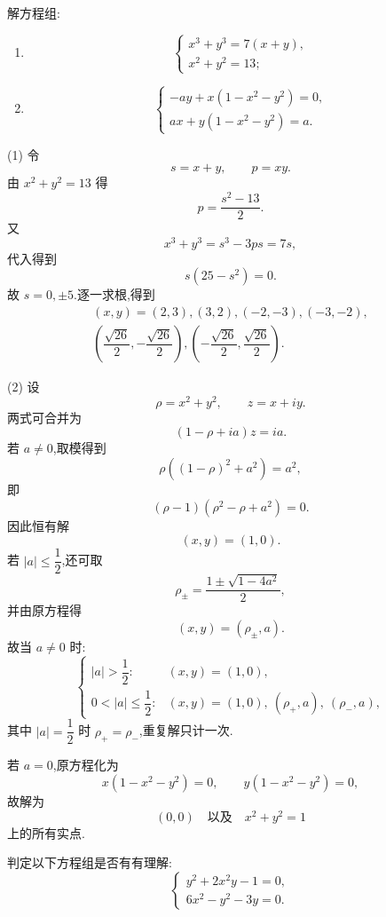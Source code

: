 \begin{example}
解方程组:
\begin{enumerate}
  \item
  \[
  \begin{cases}
    x^3+y^3=7(x+y),\\
    x^2+y^2=13;
  \end{cases}
  \]
  \item
  \[
  \begin{cases}
    -ay+x(1-x^2-y^2)=0,\\
    ax+y(1-x^2-y^2)=a.
  \end{cases}
  \]
\end{enumerate}
\end{example}
\exampleblank

\begin{solution}

(1) 令
\[
  s=x+y,
  \qquad
  p=xy.
\]
由 $x^2+y^2=13$ 得
\[
  p=\dfrac{s^2-13}{2}.
\]
又
\[
  x^3+y^3=s^3-3ps=7s,
\]
代入得到
\[
  s(25-s^2)=0.
\]
故 $s=0,\pm5$.逐一求根,得到
\[
\boxed{
\begin{gathered}
  (x,y)=(2,3),(3,2),(-2,-3),(-3,-2),\\
  \left(\dfrac{\sqrt{26}}2,-\dfrac{\sqrt{26}}2\right),
  \left(-\dfrac{\sqrt{26}}2,\dfrac{\sqrt{26}}2\right).
\end{gathered}}
\]

(2) 设
\[
  \rho=x^2+y^2,
  \qquad
  z=x+iy.
\]
两式可合并为
\[
  (1-\rho+ia)z=ia.
\]
若 $a\ne0$,取模得到
\[
  \rho\left((1-\rho)^2+a^2\right)=a^2,
\]
即
\[
  (\rho-1)(\rho^2-\rho+a^2)=0.
\]
因此恒有解
\[
  (x,y)=(1,0).
\]
若 $|a|\le\dfrac12$,还可取
\[
  \rho_{\pm}=\dfrac{1\pm\sqrt{1-4a^2}}2,
\]
并由原方程得
\[
  (x,y)=(\rho_{\pm},a).
\]
故当 $a\ne0$ 时:
\[
\boxed{
\begin{cases}
|a|>\dfrac12:&(x,y)=(1,0),\\[0.6ex]
0<|a|\le\dfrac12:&(x,y)=(1,0),\ (\rho_+,a),\ (\rho_-,a),
\end{cases}}
\]
其中 $|a|=\dfrac12$ 时 $\rho_+=\rho_-$,重复解只计一次.

若 $a=0$,原方程化为
\[
  x(1-x^2-y^2)=0,
  \qquad
  y(1-x^2-y^2)=0,
\]
故解为
\[
  (0,0)
  \quad\text{以及}\quad
  x^2+y^2=1
\]
上的所有实点.
\end{solution}

\begin{example}
判定以下方程组是否有有理解:
\[
\begin{cases}
  y^2+2x^2y-1=0,\\
  6x^2-y^2-3y=0.
\end{cases}
\]
\end{example}
\exampleblank

